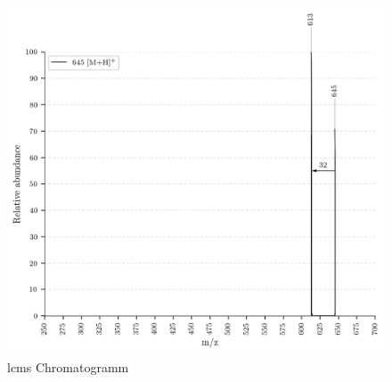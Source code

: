\begin{figure}[!htbp]
  \centering
  \includegraphics[width=\textwidth, height=0.7\textwidth]{figures/Kapitel7/Kataboliten/VWA_MS_645-2.png}
  \caption[LC-MS Chromatogramm vor der Reaktion, Quelle: Author]{\gls{lcms} Chromatogramm}
  \label{fig:LCMSChromatogramm}
\end{figure}



